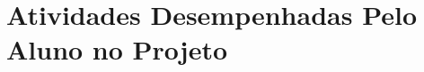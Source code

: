 \section[Atividades Desempenhadas Pelo Aluno no Projeto]{Atividades Desempenhadas Pelo Aluno no Projeto}



% 
% 
% 